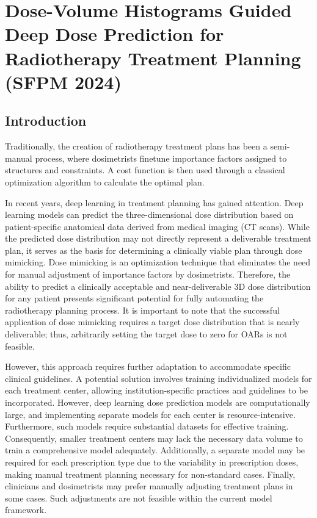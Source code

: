 \section[DVH Guided Deep Dose]{Dose-Volume Histograms Guided Deep Dose Prediction for Radiotherapy Treatment Planning (SFPM 2024)}
\subsection{Introduction}
Traditionally, the creation of radiotherapy treatment plans has been a semi-manual process, where dosimetrists finetune importance factors assigned to structures and constraints.
A cost function is then used through a classical optimization algorithm to calculate the optimal plan.

In recent years, deep learning in treatment planning has gained attention.
Deep learning models can predict the three-dimensional dose distribution based on patient-specific anatomical data derived from medical imaging (CT scans).
While the predicted dose distribution may not directly represent a deliverable treatment plan, it serves as the basis for determining a clinically viable plan through dose mimicking.
Dose mimicking is an optimization technique that eliminates the need for manual adjustment of importance factors by dosimetrists.
Therefore, the ability to predict a clinically acceptable and near-deliverable 3D dose distribution for any patient presents significant potential for fully automating the radiotherapy planning process.
It is important to note that the successful application of dose mimicking \cite{McIntosh2017,Sun2022} requires a target dose distribution that is nearly deliverable; thus, arbitrarily setting the target dose to zero for OARs is not feasible.

However, this approach requires further adaptation to accommodate specific clinical guidelines.
A potential solution involves training individualized models for each treatment center, allowing institution-specific practices and guidelines to be incorporated.
However, deep learning dose prediction models are computationally large, and implementing separate models for each center is resource-intensive.
Furthermore, such models require substantial datasets for effective training.
Consequently, smaller treatment centers may lack the necessary data volume to train a comprehensive model adequately.
Additionally, a separate model may be required for each prescription type due to the variability in prescription doses, making manual treatment planning necessary for non-standard cases.
Finally, clinicians and dosimetrists may prefer manually adjusting treatment plans in some cases.
Such adjustments are not feasible within the current model framework.


